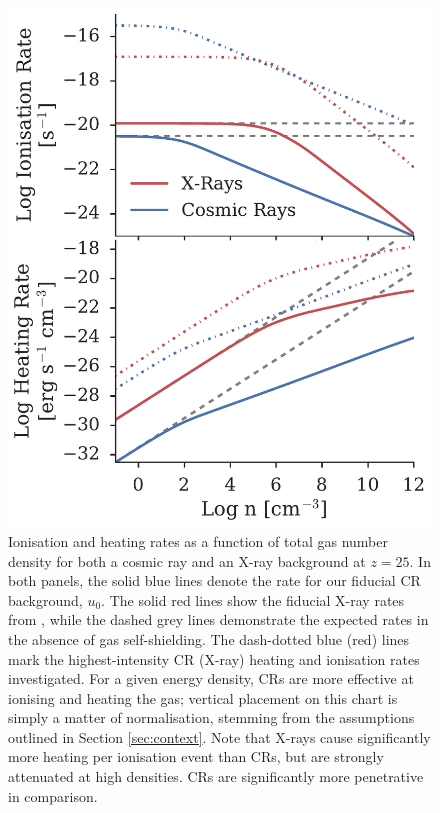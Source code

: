 \documentclass[../thesis.tex]{subfiles}
\begin{document}
\begin{figure}
\begin{center}
\includegraphics[width=\columnwidth]{figures/khrates/khratesCR}
\caption{\label{fig:khratesCR}
Ionisation and heating rates as a function of total gas number density for both a cosmic ray and an X-ray background at $z=25$. 
In both panels, the solid blue lines denote the rate for our fiducial CR background, $u_0$. The solid red lines show the fiducial X-ray rates from \citet{Hummeletal2015}, while the dashed grey lines demonstrate the expected rates in the absence of gas self-shielding.  
The dash-dotted blue (red) lines mark the highest-intensity CR (X-ray) heating and ionisation rates investigated. 
For a given energy density, CRs are more effective at ionising and heating the gas; vertical placement on this chart is simply a matter of normalisation, stemming from the assumptions outlined in Section \ref{sec:context}. 
Note that X-rays cause significantly more heating per ionisation event than CRs, but are strongly attenuated at high densities. CRs are significantly more penetrative in comparison.%
} 
\end{center}
\end{figure}
\end{document}
